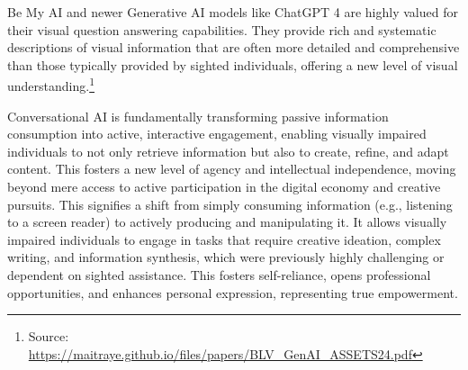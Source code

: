 Be My AI and newer Generative AI models like ChatGPT 4 are highly valued for their visual question answering capabilities. They provide rich and systematic descriptions of visual information that are often more detailed and comprehensive than those typically provided by sighted individuals, offering a new level of visual understanding.\footnote{Source: \url{https://maitraye.github.io/files/papers/BLV_GenAI_ASSETS24.pdf}}

Conversational AI is fundamentally transforming passive information consumption into active, interactive engagement, enabling visually impaired individuals to not only retrieve information but also to create, refine, and adapt content. This fosters a new level of agency and intellectual independence, moving beyond mere access to active participation in the digital economy and creative pursuits. This signifies a shift from simply consuming information (e.g., listening to a screen reader) to actively producing and manipulating it. It allows visually impaired individuals to engage in tasks that require creative ideation, complex writing, and information synthesis, which were previously highly challenging or dependent on sighted assistance. This fosters self-reliance, opens professional opportunities, and enhances personal expression, representing true empowerment.

